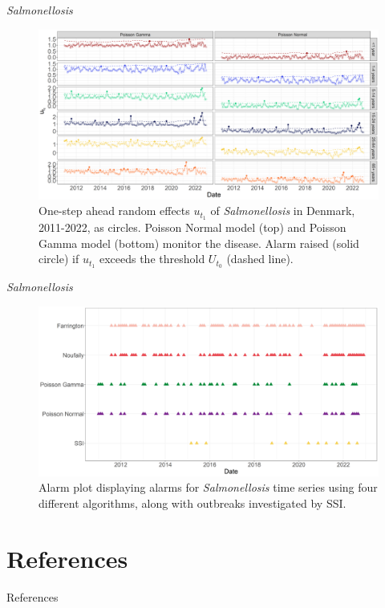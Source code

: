 \documentclass[aspectratio=169]{beamer}
\begin{document}
\begin{frame}{\emph{Salmonellosis}}
\protect\hypertarget{salmonellosis-1}{}
\tiny

\begin{figure}[H]
\includegraphics[width=0.7\linewidth]{../figures/Compare_novel_SALM} \caption{One-step ahead random effects $u_{t_1}$ of \textit{Salmonellosis} in Denmark, 2011-2022, as circles. Poisson Normal model (top) and Poisson Gamma model (bottom) monitor the disease. Alarm raised (solid circle) if $u_{t_1}$ exceeds the threshold $U_{t_0}$ (dashed line).}\label{fig:ref:CompareNovelSALM}
\end{figure}

\normalsize
\end{frame}

\begin{frame}{\emph{Salmonellosis}}
\protect\hypertarget{salmonellosis-2}{}
\tiny

\begin{figure}[H]
\includegraphics[width=0.7\linewidth]{../figures/Compare_alarms_SALM} \caption{Alarm plot displaying alarms for \textit{Salmonellosis} time series using four different algorithms, along with outbreaks investigated by SSI.}\label{fig:CompareAlarmsSALM}
\end{figure}

\normalsize
\end{frame}

\hypertarget{references}{%
\section{References}\label{references}}

\begin{frame}{References}
\printbibliography[heading=none]
\end{frame}
\end{document}
